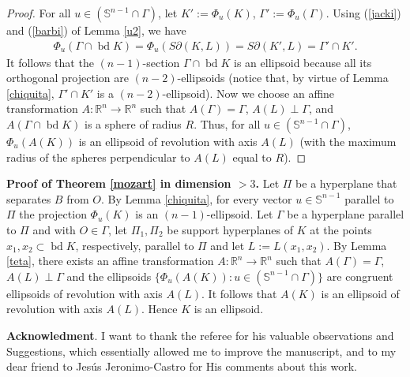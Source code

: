 \documentclass[12pt]{amsart}
\newcommand{\bd}{\operatorname*{bd}}
\newcommand{\Rn}{\mathbb{R}^{n}}
\begin{document}
\begin{proof}
                    For all $u\in (\mathbb{S}^{n-1} \cap \Gamma)$, let $K':=\Phi_u(K)$, 
                    $\Gamma':=\Phi_u(\Gamma)$. Using (\ref{jacki}) and (\ref{barbi}) of Lemma \ref{u2}, 
                    we have
\begin{eqnarray}\label{nalga}
\Phi_u(\Gamma \cap \bd K)=\Phi_u(S\partial(K,L))=S\partial(K',L)=\Gamma'\cap K'.    
\end{eqnarray} 
                    It follows that the $(n-1)$-section $\Gamma \cap \bd K$ is an ellipsoid because all 
                    its orthogonal projection are $(n-2)$-ellipsoids (notice that, by virtue of Lemma 
                    \ref{chiquita}, $\Gamma'\cap K'$ is a $(n-2)$-ellipsoid). Now we choose an affine 
                    transformation $A:\Rn \rightarrow \Rn$ such that  $A(\Gamma)=\Gamma$, 
                    $A(L)\perp \Gamma$, and $A(\Gamma \cap \bd K)$ is a sphere of radius $R$. Thus, 
                    for all $u\in (\mathbb{S}^{n-1} \cap \Gamma)$, $\Phi_u(A(K))$ is an 
                    ellipsoid of revolution with axis $A(L)$ (with the maximum radius of the spheres 
                     perpendicular to $A(L)$ equal to $R$).
\end{proof}
                    \textbf{Proof of Theorem \ref{mozart} in dimension $>3$.}
                     Let $\Pi$ be a hyperplane that separates $B$ from $O$. By Lemma \ref{chiquita}, 
                     for every vector $u\in \mathbb{S}^{n-1}$ parallel to $\Pi$ the projection $\Phi_u(K)$ 
                     is an $(n-1)$-ellipsoid. Let $\Gamma$ be a hyperplane parallel to $\Pi$ and with 
                     $O\in \Gamma$, let $\Pi_1,\Pi_2$ be support hyperplanes of $K$ at the points 
                     $x_1,x_2\subset \bd K$, respectively, parallel to $\Pi$ and let $L:=L(x_1, x_2)$. By 
                     Lemma \ref{teta}, there exists an affine transformation $A:\Rn \rightarrow \Rn$ such 
                    that $A(\Gamma)=\Gamma$, $A(L)\perp \Gamma$ and the ellipsoids 
                    $\{\Phi_u(A(K)): u\in (\mathbb{S}^{n-1}\cap \Gamma) \}$ are congruent ellipsoids of 
                    revolution with axis $A(L)$. It follows that $A(K)$ is an ellipsoid of revolution with axis 
                    $A(L)$.  Hence $K$ is an ellipsoid.
                    
                    \textbf{Acknowledment}. I want to thank the referee for his valuable observations and 
                    Su\-gges\-tions, which essentially allowed me to improve the manuscript, and to my dear 
                    friend to Jes\'us Jeronimo-Castro for His comments about this work.
 
\end{document}

